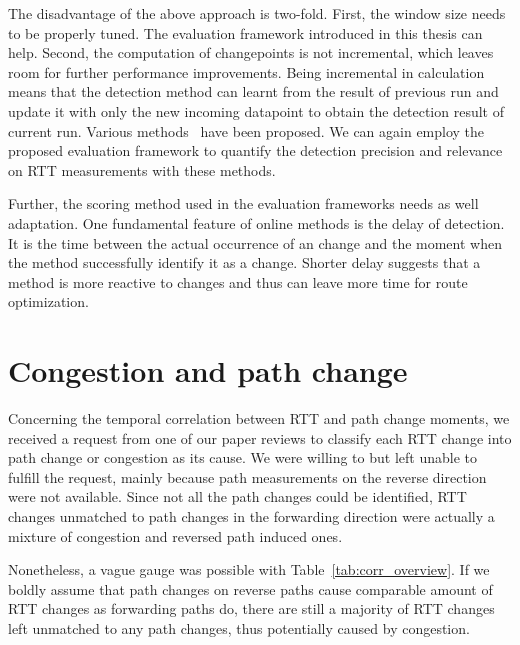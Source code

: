 The disadvantage of the above approach is two-fold. First, the window size needs to be properly tuned. The evaluation framework introduced in this thesis can help. Second, the computation of changepoints is not incremental, which leaves room for further performance improvements. Being incremental in calculation means that the detection method can learnt from the result of previous run and update it with only the new incoming datapoint to obtain the detection result of current run. Various methods~\cite{Caron2012,Turner2009a,Sharkey2014,Ho2014,Adams2007,Conditions2015} have been proposed. We can again employ the proposed evaluation framework to quantify the detection precision and relevance on RTT measurements with these methods.

Further, the scoring method used in the evaluation frameworks needs as well adaptation.
One fundamental feature of online methods is the delay of detection. It is the time between the actual occurrence of an change and the moment when the method successfully identify it as a change. Shorter delay suggests that a method is more reactive to changes and thus can leave more time for route optimization.

\section{Congestion and path change}
Concerning the temporal correlation between RTT and path change moments, we received a request from one of our paper reviews to classify each RTT change into path change or congestion as its cause. We were willing to but left unable to fulfill the request,  mainly because path measurements on the reverse direction were not available. Since not all the path changes could be identified, RTT changes unmatched to path changes in the forwarding direction were actually a mixture of congestion and reversed path induced ones. 

Nonetheless, a vague gauge was possible with Table~\ref{tab:corr_overview}.
If we boldly assume that path changes on reverse paths cause comparable amount of RTT changes as forwarding paths do, there are still a majority of RTT changes left unmatched to any path changes, thus potentially caused by congestion.

